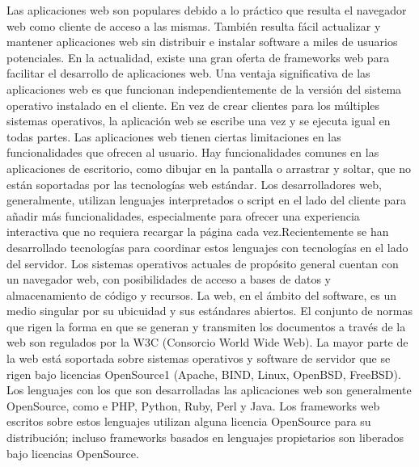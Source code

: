 \documentclass[a4paper]{report}
\begin{document}
Las aplicaciones web son populares debido a lo práctico que resulta el navegador
web como cliente de acceso a las mismas.
También resulta fácil actualizar y mantener aplicaciones web sin distribuir e
instalar software a miles de usuarios potenciales.
En la actualidad, existe una gran oferta de frameworks web para facilitar el
desarrollo de aplicaciones web.
Una ventaja significativa de las aplicaciones web es que funcionan
independientemente de la versión del sistema operativo instalado en el cliente.
En vez de crear clientes para los múltiples sistemas operativos, la aplicación
web se escribe una vez y se ejecuta igual en todas partes.
Las aplicaciones web tienen ciertas limitaciones en las funcionalidades que
ofrecen al usuario.
Hay funcionalidades comunes en las aplicaciones de escritorio, como dibujar en
la pantalla o arrastrar y soltar, que no están soportadas por las tecnologías
web estándar.
Los desarrolladores web, generalmente, utilizan lenguajes interpretados o script
en el lado del cliente para añadir más funcionalidades, especialmente para
ofrecer una experiencia interactiva que no requiera recargar la página cada
vez.Recientemente se han desarrollado tecnologías para coordinar estos lenguajes
con tecnologías en el lado del servidor.
Los sistemas operativos actuales de propósito general cuentan con un navegador
web, con posibilidades de acceso a bases de datos y almacenamiento de código y
recursos.
La web, en el ámbito del software, es un medio singular por su ubicuidad y sus
estándares abiertos. El conjunto de normas que rigen la forma en que se generan
y transmiten los documentos a través de la web son regulados por la W3C
(Consorcio World Wide Web). La mayor parte de la web está soportada sobre
sistemas operativos y software de servidor que se rigen bajo licencias
OpenSource1 (Apache, BIND, Linux, OpenBSD, FreeBSD). Los lenguajes con los que
son desarrolladas las aplicaciones web son generalmente OpenSource, como e PHP,
Python, Ruby, Perl y Java. Los frameworks web escritos sobre estos lenguajes
utilizan alguna licencia OpenSource para su distribución; incluso frameworks
basados en lenguajes propietarios son liberados bajo licencias OpenSource.
\end{document}
